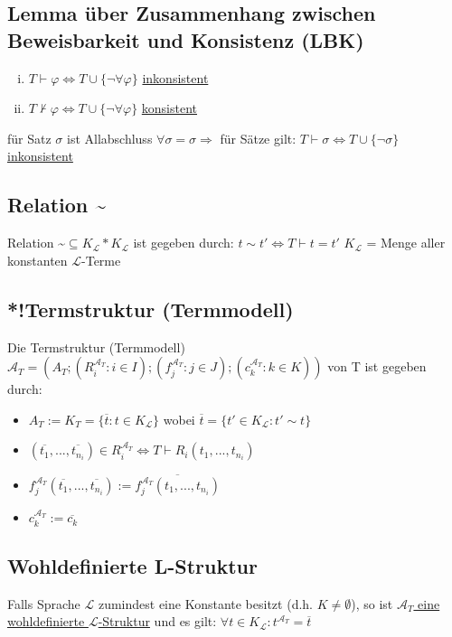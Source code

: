 \documentclass[12pt,a4paper]{article} %
\begin{document}
	\subsection{Lemma über Zusammenhang zwischen Beweisbarkeit und Konsistenz (LBK)}
	\begin{enumerate}[(i)]
		\item $T \hyperref[Beweisbar]{\vdash} \varphi \Leftrightarrow T \cup \{\neg \forall \varphi\}$ \hyperref[PLKonsistent]{inkonsistent}
		\item $T \nvdash \varphi \Leftrightarrow T \cup \{\neg \forall \varphi\}$ \hyperref[PLKonsistent]{konsistent}
	\end{enumerate}
	für Satz $\sigma$ ist Allabschluss $\forall \sigma = \sigma \Rightarrow$ für Sätze gilt: $T \hyperref[Beweisbar]{\vdash} \sigma \Leftrightarrow T \cup \{\neg \sigma\}$ \hyperref[PLKonsistent]{inkonsistent}
	
	\subsection{Relation \textasciitilde}
	Relation \textasciitilde $\subseteq K_{\mathcal{L}} * K_{\mathcal{L}}$ ist gegeben durch: $ t \sim t' \Leftrightarrow T \hyperref[Beweisbar]{\vdash} t = t'$ \newline
	$K_{\mathcal{L}}$ = Menge aller konstanten $\mathcal{L}$-Terme 
	
	\subsection{*!Termstruktur (Termmodell)}
	Die Termstruktur (Termmodell) $\mathcal{A}_T = (A_T; (R_i^{\mathcal{A}_T}: i \in I); (f_j^{\mathcal{A}_T}: j \in J); (c_k^{\mathcal{A}_T}: k \in K))$ von T ist gegeben durch: 
	\begin{itemize}
		\item $A_T := K_T = \{\overline{t}: t \in K_{\mathcal{L}}\}$ wobei $\overline{t} = \{t' \in K_{\mathcal{L}}: t' \sim t\}$
		\item $(\overline{t_1}, ..., \overline{t_{n_i}}) \in R_i^{\mathcal{A}_T} \Leftrightarrow T \hyperref[Beweisbar]{\vdash} R_i(t_1, ..., t_{n_i})$
		\item $f_j^{\mathcal{A}_T}(\overline{t_1}, ..., \overline{t_{n_i}}) := \overline{f_j^{\mathcal{A}_T}(t_1, ..., t_{n_i})}$
		\item $c_k^{\mathcal{A}_T} := \overline{c_k}$
	\end{itemize}

	\subsection{Wohldefinierte L-Struktur}
	Falls Sprache $\mathcal{L}$ zumindest eine Konstante besitzt (d.h. $K \ne \emptyset$), so ist \hyperref[Struktur]{$\mathcal{A}_T$ eine wohldefinierte $\mathcal{L}$-Struktur} und es gilt: $\forall t \in K_{\mathcal{L}}: t^{\mathcal{A}_T} = \overline{t}$
	
\end{document}
